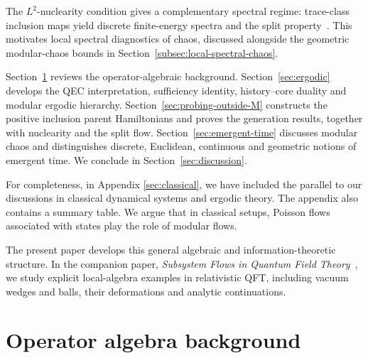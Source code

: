 \documentclass[a4paper,11pt]{article}
\theoremstyle{definition}
\begin{document}
The $L^2$-nuclearity condition gives a complementary spectral regime:
trace-class inclusion maps yield discrete finite-energy spectra and the
split property~\cite{BuchholzDAntoniLongo1990,BDL2007}.  This motivates
local spectral diagnostics of chaos, discussed alongside the geometric
modular-chaos bounds in Section~\ref{subsec:local-spectral-chaos}.


Section~\ref{section:basics} reviews the operator-algebraic background.  Section~\ref{sec:ergodic} develops the QEC interpretation, sufficiency identity, history--core duality and modular ergodic hierarchy.  Section~\ref{sec:probing-outside-M} constructs the positive inclusion parent Hamiltonians and proves the generation results, together with nuclearity and the split flow.  Section~\ref{sec:emergent-time} discusses modular chaos and distinguishes discrete, Euclidean, continuous and geometric notions of emergent time. We conclude in Section~\ref{sec:discussion}.  

For completeness, in Appendix \ref{sec:classical}, we have included the parallel to our discussions in classical dynamical systems and ergodic theory. The appendix also contains a summary table. We argue that in classical setups, Poisson flows associated with states play the role of modular flows.

The present paper develops this general algebraic and information-theoretic structure.  In the companion paper, \emph{Subsystem Flows in Quantum Field Theory}~\cite{companionQFT}, we study explicit local-algebra examples in relativistic QFT, including vacuum wedges and balls, their deformations and analytic continuations.


\section{Operator algebra background}\label{section:basics}
\end{document}
